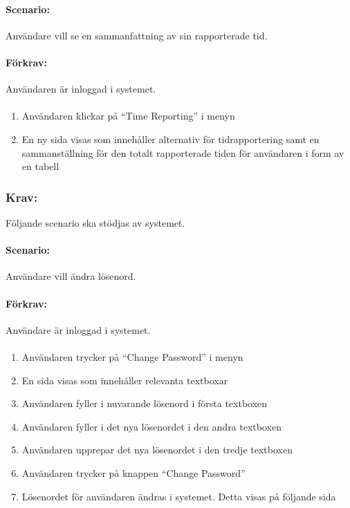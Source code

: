 \documentclass[paper=a4, fontsize=11pt,twoside]{article}
\begin{document}
	\paragraph{Scenario:}Användare vill se en sammanfattning av sin rapporterade tid.
	\paragraph{Förkrav:}
	Användaren är inloggad i systemet.
	\paragraph{}
	\begin{enumerate}
		\item  Användaren klickar på “Time Reporting” i menyn
		\item  En ny sida visas som innehåller alternativ för tidrapportering samt en sammanställning för den totalt rapporterade tiden för användaren i form av en tabell
		
	\end{enumerate}
	\subsubsection{Krav:} Följande scenario ska stödjas av systemet.
	\paragraph{Scenario:}Användare vill ändra lösenord.
	\paragraph{Förkrav:}
	Användare är inloggad i systemet.
	\paragraph{}
	\begin{enumerate}
		\item	Användaren trycker på “Change Password” i menyn
		\item	En sida visas som innehåller relevanta textboxar
		\item	Användaren fyller i nuvarande lösenord i första textboxen
		\item	Användaren fyller i det nya lösenordet i den andra textboxen
		\item	Användaren upprepar det nya lösenordet i den tredje textboxen
		\item	Användaren trycker på knappen “Change Password”
		\item	Lösenordet för användaren ändras i systemet. Detta visas på följande sida
		
	\end{enumerate}
	
\end{document}
